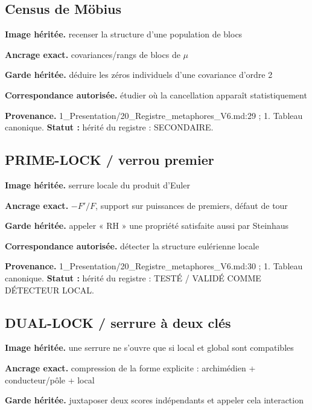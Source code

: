 \documentclass[
  9pt,
  a4paper,
]{article}
\begin{document}
\hypertarget{census-de-muxf6bius}{%
\subsection{Census de Möbius}\label{census-de-muxf6bius}}

\textbf{Image héritée.} recenser la structure d'une population de blocs

\textbf{Ancrage exact.} covariances/rangs de blocs de \(\mu\)

\textbf{Garde héritée.} déduire les zéros individuels d'une covariance
d'ordre 2

\textbf{Correspondance autorisée.} étudier où la cancellation apparaît
statistiquement

\textbf{Provenance.} 1\_Presentation/20\_Registre\_metaphores\_V6.md:29
; 1. Tableau canonique. \textbf{Statut :} hérité du registre :
SECONDAIRE.

\hypertarget{prime-lock-verrou-premier}{%
\subsection{PRIME-LOCK / verrou
premier}\label{prime-lock-verrou-premier}}

\textbf{Image héritée.} serrure locale du produit d'Euler

\textbf{Ancrage exact.} \(-F'/F\), support sur puissances de premiers,
défaut de tour

\textbf{Garde héritée.} appeler « RH » une propriété satisfaite aussi
par Steinhaus

\textbf{Correspondance autorisée.} détecter la structure eulérienne
locale

\textbf{Provenance.} 1\_Presentation/20\_Registre\_metaphores\_V6.md:30
; 1. Tableau canonique. \textbf{Statut :} hérité du registre : TESTÉ /
VALIDÉ COMME DÉTECTEUR LOCAL.

\hypertarget{dual-lock-serrure-uxe0-deux-cluxe9s}{%
\subsection{DUAL-LOCK / serrure à deux
clés}\label{dual-lock-serrure-uxe0-deux-cluxe9s}}

\textbf{Image héritée.} une serrure ne s'ouvre que si local et global
sont compatibles

\textbf{Ancrage exact.} compression de la forme explicite : archimédien
+ conducteur/pôle + local

\textbf{Garde héritée.} juxtaposer deux scores indépendants et appeler
cela interaction
\end{document}
